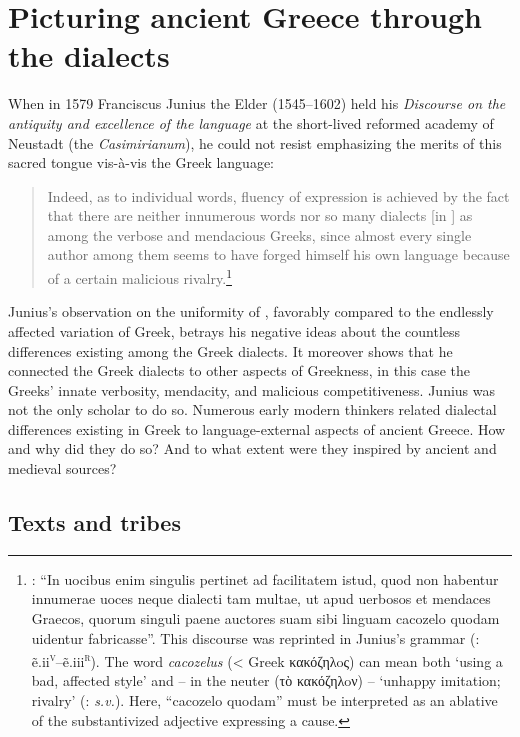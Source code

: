 \chapter{Picturing ancient Greece through the dialects}\label{chap:7}\largerpage

When in 1579 Franciscus Junius the Elder (1545–1602) held his \textit{Discourse on the antiquity and excellence of the  language} at the short-lived reformed academy of Neustadt (the \textit{Casimirianum}), he could not resist emphasizing the merits of this sacred tongue vis-à-vis the Greek language:

\begin{quote}
Indeed, as to individual words, fluency of expression is achieved by the fact that there are neither innumerous words nor so many dialects [in ] as among the verbose and mendacious Greeks, since almost every single author among them seems to have forged himself his own language because of a certain malicious rivalry.\footnote{\citet[\textsc{b.3}\textsc{\textsuperscript{v}}]{Junius1579}: “In uocibus enim singulis pertinet ad facilitatem istud, quod non habentur innumerae uoces neque dialecti tam multae, ut apud uerbosos et mendaces Graecos, quorum singuli paene auctores suam sibi linguam cacozelo quodam uidentur fabricasse”. This discourse was reprinted in Junius’s  grammar (\citealt{Junius1580}: ẽ.ii\textsc{\textsuperscript{v}}–ẽ.iii\textsc{\textsuperscript{r}}). The word \textit{cacozelus} (< Greek κακόζηλoς) can mean both ‘using a bad, affected style’ and – in the neuter (τὸ κακόζηλoν) – ‘unhappy imitation; rivalry’ (\citealt{LiddellScott1940}: \textit{s.v.}). Here, “cacozelo quodam” must be interpreted as an ablative of the substantivized adjective expressing a cause.}
\end{quote}

Junius’s observation on the uniformity of , favorably compared to the endlessly affected variation of Greek, betrays his negative ideas about the countless differences existing among the Greek dialects. It moreover shows that he connected the Greek dialects to other aspects of Greekness, in this case the Greeks’ innate verbosity, mendacity, and malicious competitiveness. Junius was not the only scholar to do so. Numerous early modern thinkers related dialectal differences existing in Greek to language-external aspects of ancient Greece. How and why did they do so? And to what extent were they inspired by ancient and medieval sources?

\section{Texts and tribes}\label{sec:7.1}

